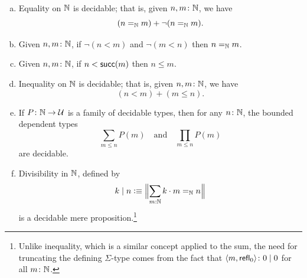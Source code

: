 \begin{prop}\label{prop:decidability-of-equality-on-N}${}$
    \begin{enumerate}[a), font=\upshape]
        \item Equality on\/ $\mathbb{N}$ is decidable; that is, given\/ $n,m\colon\N$, we have 
        \[
            (n\mathrel{=_{\mathbb{N}}} m)+\neg(n\mathrel{=_{\mathbb{N}}} m).
        \]
        
        \item Given\/ $n,m\colon\N$, if\/ $\neg(n<m)$ and\/ $\neg(m<n)$ then\/ $n\mathrel{=_{\mathbb{N}}} m$.
        
        \item Given\/ $n,m\colon\N$, if\/ $n<\mathsf{succ}(m)$ then\/ $n\le m$.
        
        \item Inequality on\/ $\mathbb{N}$ is decidable; that is, given\/ $n,m\colon\N$, we have
        \[
            (n<m)+(m\le n).
        \]

        \item If\/ $P\colon\N\to\univ$ is a family of decidable types, then for any\/ $n\colon\N$, the bounded dependent types
        \[
            \sum_{m\le n}P(m)
            \quad\text{and}\quad
            \prod_{m\le n}P(m)
        \]
        are decidable.
        
        \item Divisibility in\/ $\mathbb{N}$, defined by
        \[
            k\mid n\mathrel{\vcentcolon}\equiv
                \Bigl\lVert
                    \sum_{m:\mathbb{N}}k\cdot m\mathrel{=_{\mathbb{N}}} n
                \Bigr\rVert
        \]
        is a decidable mere proposition.\footnote{Unlike inequality, which is a similar concept applied to the sum, the need for truncating the defining $\Sigma$-type comes from the fact that $\dep{m,\fun{refl}_0}\colon 0\mid0$ for all $m\colon\N$.}
    \end{enumerate} 
\end{prop}

